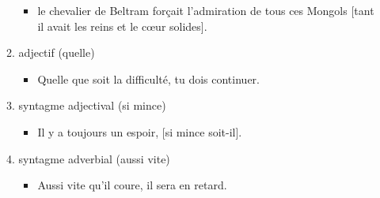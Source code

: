 \documentclass[UTF8]{report}
\begin{document}
\begin{enumerate}
\begin{enumerate}
        \begin{itemize}
            \item le chevalier de Beltram forçait l’admiration de tous ces Mongols [tant il avait les reins et le cœur solides]. 
        \end{itemize}
        \item adjectif (quelle)
        \begin{itemize}
            \item Quelle que soit la difficulté, tu dois continuer.
        \end{itemize}
        \item syntagme adjectival (si mince)
        \begin{itemize}
            \item Il y a toujours un espoir, [si mince soit-il].
        \end{itemize}
        \item syntagme adverbial (aussi vite)
        \begin{itemize}
            \item Aussi vite qu’il coure, il sera en retard.
        \end{itemize}
    \end{enumerate}
\end{enumerate}
\end{document}
